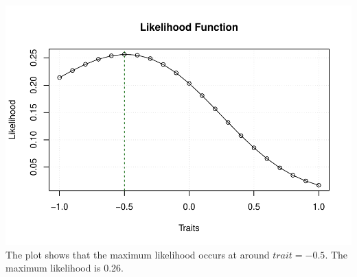 \documentclass[
]{article}
\begin{document}
\includegraphics{Assignment_2_files/figure-latex/unnamed-chunk-6-1.pdf}
The plot shows that the maximum likelihood occurs at around
\(trait=-0.5\). The maximum likelihood is 0.26.
\end{document}
